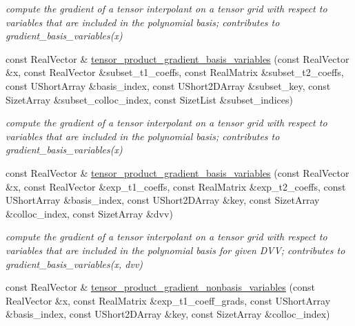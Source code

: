 \begin{DoxyCompactItemize}
\begin{DoxyCompactList}\small\item\em compute the gradient of a tensor interpolant on a tensor grid with respect to variables that are included in the polynomial basis; contributes to gradient\+\_\+basis\+\_\+variables(x) \end{DoxyCompactList}\item 
const Real\+Vector \& \hyperlink{classPecos_1_1SharedInterpPolyApproxData_a270628afd71964f2923b8a356a8f30ef}{tensor\+\_\+product\+\_\+gradient\+\_\+basis\+\_\+variables} (const Real\+Vector \&x, const Real\+Vector \&subset\+\_\+t1\+\_\+coeffs, const Real\+Matrix \&subset\+\_\+t2\+\_\+coeffs, const U\+Short\+Array \&basis\+\_\+index, const U\+Short2\+D\+Array \&subset\+\_\+key, const Sizet\+Array \&subset\+\_\+colloc\+\_\+index, const Sizet\+List \&subset\+\_\+indices)\label{classPecos_1_1SharedInterpPolyApproxData_a270628afd71964f2923b8a356a8f30ef}

\begin{DoxyCompactList}\small\item\em compute the gradient of a tensor interpolant on a tensor grid with respect to variables that are included in the polynomial basis; contributes to gradient\+\_\+basis\+\_\+variables(x) \end{DoxyCompactList}\item 
const Real\+Vector \& \hyperlink{classPecos_1_1SharedInterpPolyApproxData_ad4f29e05ded8b3a5683444124d1afe2b}{tensor\+\_\+product\+\_\+gradient\+\_\+basis\+\_\+variables} (const Real\+Vector \&x, const Real\+Vector \&exp\+\_\+t1\+\_\+coeffs, const Real\+Matrix \&exp\+\_\+t2\+\_\+coeffs, const U\+Short\+Array \&basis\+\_\+index, const U\+Short2\+D\+Array \&key, const Sizet\+Array \&colloc\+\_\+index, const Sizet\+Array \&dvv)\label{classPecos_1_1SharedInterpPolyApproxData_ad4f29e05ded8b3a5683444124d1afe2b}

\begin{DoxyCompactList}\small\item\em compute the gradient of a tensor interpolant on a tensor grid with respect to variables that are included in the polynomial basis for given D\+VV; contributes to gradient\+\_\+basis\+\_\+variables(x, dvv) \end{DoxyCompactList}\item 
const Real\+Vector \& \hyperlink{classPecos_1_1SharedInterpPolyApproxData_ae51c50e333a72c0185801efc41967666}{tensor\+\_\+product\+\_\+gradient\+\_\+nonbasis\+\_\+variables} (const Real\+Vector \&x, const Real\+Matrix \&exp\+\_\+t1\+\_\+coeff\+\_\+grads, const U\+Short\+Array \&basis\+\_\+index, const U\+Short2\+D\+Array \&key, const Sizet\+Array \&colloc\+\_\+index)\label{classPecos_1_1SharedInterpPolyApproxData_ae51c50e333a72c0185801efc41967666}


\end{DoxyCompactItemize}

